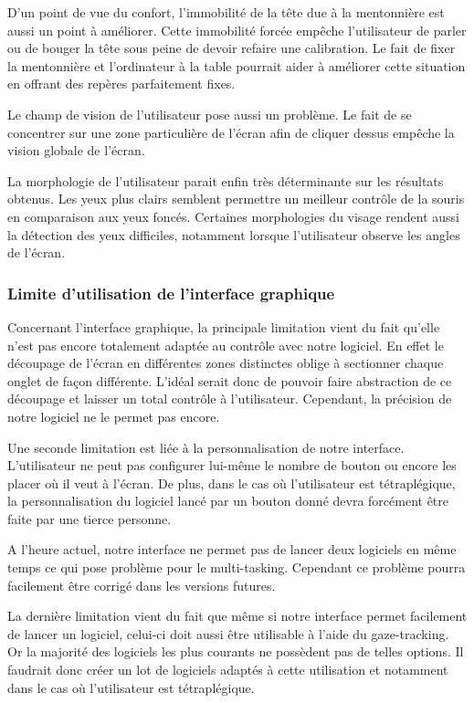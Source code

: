 D’un point de vue du confort, l’immobilité de la tête due à la mentonnière est aussi un point à améliorer. Cette immobilité forcée empêche l’utilisateur de parler ou de bouger la tête sous peine de devoir refaire une calibration. Le fait de fixer la mentonnière et l’ordinateur à la table pourrait aider à améliorer cette situation en offrant des repères parfaitement fixes.

Le champ de vision de l’utilisateur pose aussi un problème. Le fait de se concentrer sur une zone particulière de l’écran afin de cliquer dessus empêche la vision globale de l’écran.

La morphologie de l’utilisateur parait enfin très déterminante sur les résultats obtenus. Les yeux plus clairs semblent permettre un meilleur contrôle de la souris en comparaison aux yeux foncés. Certaines morphologies du visage rendent aussi la détection des yeux difficiles, notamment lorsque l’utilisateur observe les angles de l’écran.

\subsubsection{Limite d’utilisation de l’interface graphique}

Concernant l’interface graphique, la principale limitation vient du fait qu’elle n’est pas encore totalement adaptée au contrôle avec notre logiciel. En effet le découpage de l’écran en différentes zones distinctes oblige à sectionner chaque onglet de façon différente. L’idéal serait donc de pouvoir faire abstraction de ce découpage et laisser un total contrôle à l’utilisateur. Cependant, la précision de notre logiciel ne le permet pas encore.

Une seconde limitation est liée à la personnalisation de notre interface. L’utilisateur ne peut pas configurer lui-même le nombre de bouton ou encore les placer où il veut à l’écran. De plus, dans le cas où l’utilisateur est tétraplégique, la personnalisation du logiciel lancé par un bouton donné devra forcément être faite par une tierce personne.

A l’heure actuel, notre interface ne permet pas de lancer deux logiciels en même temps ce qui pose problème pour le multi-tasking. Cependant ce problème pourra facilement être corrigé dans les versions futures.

La dernière limitation vient du fait que même si notre interface permet facilement de lancer un logiciel, celui-ci doit aussi être utilisable à l’aide du gaze-tracking. Or la majorité des logiciels les plus courants ne possèdent pas de telles options. Il faudrait donc créer un lot de logiciels adaptés à cette utilisation et notamment dans le cas où l’utilisateur est tétraplégique.